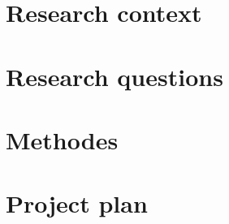 \documentclass[11pt, a4paper, oneside, article]{memoir}
\begin{document}


\chapter{Research context}


\chapter{Research questions}


\chapter{Methodes}


\chapter{Project plan}



\printglossaries

\newpage
\printbibliography[env=bibliography]
\end{document}
